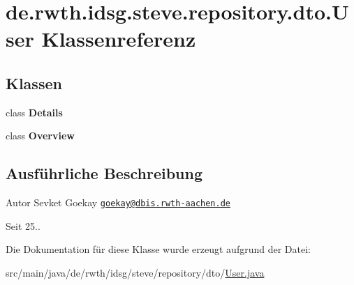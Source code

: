 \hypertarget{classde_1_1rwth_1_1idsg_1_1steve_1_1repository_1_1dto_1_1_user}{\section{de.\+rwth.\+idsg.\+steve.\+repository.\+dto.\+User Klassenreferenz}
\label{classde_1_1rwth_1_1idsg_1_1steve_1_1repository_1_1dto_1_1_user}
}
\subsection*{Klassen}
\begin{DoxyCompactItemize}
\item 
class {\bfseries Details}
\item 
class {\bfseries Overview}
\end{DoxyCompactItemize}


\subsection{Ausführliche Beschreibung}
\begin{DoxyAuthor}{Autor}
Sevket Goekay \href{mailto:goekay@dbis.rwth-aachen.de}{\tt goekay@dbis.\+rwth-\/aachen.\+de} 
\end{DoxyAuthor}
\begin{DoxySince}{Seit}
25.. 
\end{DoxySince}


Die Dokumentation für diese Klasse wurde erzeugt aufgrund der Datei\+:\begin{DoxyCompactItemize}
\item 
src/main/java/de/rwth/idsg/steve/repository/dto/\hyperlink{_user_8java}{User.\+java}\end{DoxyCompactItemize}
